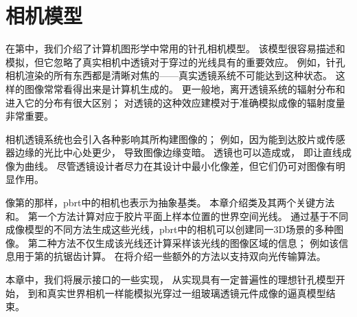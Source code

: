 \chapter{相机模型}\label{chap:相机模型}
\setcounter{sidenote}{1}

在第中，我们介绍了计算机图形学中常用的针孔相机模型。
该模型很容易描述和模拟，但它忽略了真实相机中透镜对于穿过的光线具有的重要效应。
例如，针孔相机渲染的所有东西都是清晰对焦的——真实透镜系统不可能达到这种状态。
这样的图像常常看得出来是计算机生成的。
更一般地，离开透镜系统的辐射分布和进入它的分布有很大区别；
对透镜的这种效应建模对于准确模拟成像的辐射度量非常重要。

相机透镜系统也会引入各种影响其所构建图像的；
例如，因为能到达胶片或传感器边缘的光比中心处更少，
导致图像边缘变暗。
透镜也可以造成或，
即让直线成像为曲线。
尽管透镜设计者尽力在其设计中最小化像差，但它们仍可对图像有明显作用。

像第的那样，pbrt中的相机也表示为抽象基类。
本章介绍类及其两个关键方法
和。
第一个方法计算对应于胶片平面上样本位置的世界空间光线。
通过基于不同成像模型的不同方法生成这些光线，pbrt中的相机可以创建同一3D场景的多种图像。
第二种方法不仅生成该光线还计算采样该光线的图像区域的信息；
例如该信息用于第的抗锯齿计算。
在将介绍一些额外的方法以支持双向光传输算法。

本章中，我们将展示接口的一些实现，
从实现具有一定普遍性的理想针孔模型开始，
到和真实世界相机一样能模拟光穿过一组玻璃透镜元件成像的逼真模型结束。














